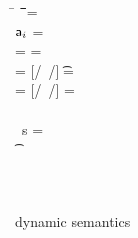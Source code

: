\documentclass[acmlarge, anonymous, authordraft, review]{acmart} %
\begin{document}
%
\begin{figure}[!h]
\noindent\hrulefill


\medskip
\small

\begin{minipage}{\textwidth}
\small        
\begin{tabbing}
  \K\HS \New{} \HS\HS\HS\= \s~ \HS\HS \=\Red\HS\HS \= \K \HS\= \ap \HS\HS\= \sp\HS\HS \= \WHERE\HS\= \fresh\ap \HS\HS\HS\HS\HS\HS\HS\HS\=  \sp = {\Map{}}
\\
\K\HS \FReadR\a{\f[i]} \> \s           \>\Red\>     \K \>$\a[i]$ \> \s  \> \WHERE \>\App\s\a=\obj{}
\\
\K\HS {\FWriteR\a{\f[i]}\ap} \> \s     \>\Red\>     \K \> \ap \> \sp \>  \WHERE \>\App\s\a=\obj{} \HS  \> \sp = \Map{}
\\
\K\HS{\KCall\a\m\ap\t\tp} \> \s      \>\Red\>     \K \>  \ep \> \s \> \WHERE\> \ep = {[\a/\this~{\ap/\x}]\e} \HS \> \Mdef\m\x\t\tp\e\In \App\K\C  \HS  \App\s\a=\obj{}
\\
 \K\HS {\DynCall\a\m\ap}\> \s        \>\Red\>    \K \> \ep \> \s \>  \WHERE\> \ep = {[\a/\this~{\ap/\x}]\e}\HS \> \Mdef\m\x\any\any\e \In \App\K\C \HS \App\s\a=\obj{}
\\
 \K\HS {\SubCast \any\a} \> \s       \>\Red\>   \K \> \a \> \s
\\
 \K\HS {\SubCast \D\a} \> \ s        \>\Red\>    \K \> \a \> \s \>  \WHERE\> \StrSub {}\K\C \D \>\App\s\a=\obj{} 
\\
 \K\HS {\BehCast \t\a} \> \s         \>\Red\>   \Kp \> \ap \> \sp \> \WHERE\> \behcast \a\t\s\K \Kp\ap\sp    
\\
\K\HS\e \>\s                         \>\Red\>   \Kp \> \ep \> \sp
\\
\K \HS \EM{\EE[\e]} \> \s            \>\Red\>   \Kp \> \EM{\EE[\ep]} \> \sp \> \WHERE \> \K~\e~\s \Red~\Kp~\ep~\sp
\end{tabbing}
\end{minipage}

\medskip

\hrulefill
\caption{\kafka dynamic semantics}\label{fig:semantics}
\end{figure}
\end{document}
